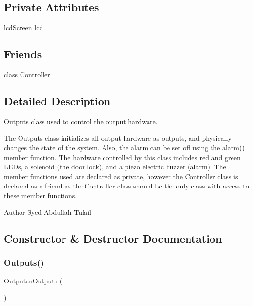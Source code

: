 \subsection*{Private Attributes}
\begin{DoxyCompactItemize}
\item 
\hyperlink{classlcdScreen}{lcd\+Screen} \hyperlink{classOutputs_a75eb0439cced956d5756a3d965e528d0}{lcd}
\end{DoxyCompactItemize}
\subsection*{Friends}
\begin{DoxyCompactItemize}
\item 
class \hyperlink{classOutputs_ac3456fd331a58b288082abca310c7a99}{Controller}
\end{DoxyCompactItemize}


\subsection{Detailed Description}
\hyperlink{classOutputs}{Outputs} class used to control the output hardware. 

The \hyperlink{classOutputs}{Outputs} class initializes all output hardware as outputs, and physically changes the state of the system. Also, the alarm can be set off using the \hyperlink{classOutputs_a610431c941db0b5c750f55ae47ce1783}{alarm()} member function. The hardware controlled by this class includes red and green L\+E\+Ds, a solenoid (the door lock), and a piezo electric buzzer (alarm). The member functions used are declared as private, however the \hyperlink{classController}{Controller} class is declared as a friend as the \hyperlink{classController}{Controller} class should be the only class with access to these member functions.

\begin{DoxyAuthor}{Author}
Syed Abdullah Tufail 
\end{DoxyAuthor}


\subsection{Constructor \& Destructor Documentation}
\mbox{\label{classOutputs_a86768c5f5c0ce6ab00c4bac00f3b5e63}} 
\subsubsection{\texorpdfstring{Outputs()}{Outputs()}}
{\footnotesize\ttfamily Outputs\+::\+Outputs (\begin{DoxyParamCaption}{ }\end{DoxyParamCaption})\hspace{0.3cm}{\ttfamily [private]}}



